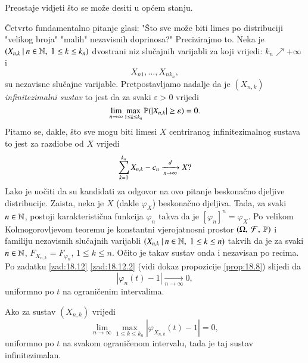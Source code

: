 Preostaje vidjeti \v sto se mo\v ze desiti u op\' cem stanju.

\v Cetvrto fundamentalno pitanje glasi: "\v Sto sve mo\v ze biti limes po distribuciji "velikog broja" "malih" nezavisnih doprinosa?"
Precizirajmo to.
Neka je $({X_{n, k}} \: | \: {n \in \mathbb{N}, \; 1 \leq k \leq k_n})$ dvostrani niz slu\v cajnih varijabli za koji vrijedi: $k_n \nearrow +\infty$ i
\begin{equation*}
    X_{n1}, \ldots, X_{n k_n},
\end{equation*}
su nezavisne slu\v cajne varijable.
Pretpostavljamo nadalje da je $(X_{n, k})$ \emph{infinitezimalni sustav} to jest da za svaki $\varepsilon > 0$ vrijedi
\begin{equation}    \label{jed:20.12}
    \lim\limits_{n \to \infty} \max\limits_{1 \leq k \leq k_n} \mathbb{P} (|X_{n, k}| \geq \varepsilon) = 0.
\end{equation}
Pitamo se, dakle, \v sto sve mogu biti limesi $X$ centriranog infinitezimalnog sustava to jest za razdiobe od $X$ vrijedi
\begin{equation}    \label{jed:20.13}
    \sum\limits_{k = 1}^{k_n} X_{n, k} - c_n \xrightarrow[n \to \infty]{d} X?
\end{equation}
Lako je uo\v citi da su kandidati za odgovor na ovo pitanje beskona\v cno djeljive distribucije.
Zaista, neka je $X$ (dakle $\varphi_X$) beskona\v cno djeljiva.
Tada, za svaki $n \in \mathbb{N}$, postoji karakteristi\v cna funkcija $\varphi_n$ takva da je $[\varphi_n]^n = \varphi_X$.
Po velikom Kolmogorovljevom teoremu je konstantni vjerojatnosni prostor $(\Omega, \: \mathcal{F}, \: \mathbb{P})$ i familiju nezavisnih slu\v cajnih varijabli $({X_{n, k}} \: | \: {n \in \mathbb{N}, \; 1 \leq k \leq n})$ takvih da je za svaki $n \in \mathbb{N}$, $F_{X_{n, k}} = F_{\varphi_n}$, $1 \leq k \leq n$.
O\v cito je takav sustav onda i nezavisan po recima.
Po zadatku \ref{zad:18.12} \ref{zad:18.12.2} (vidi dokaz propozicije \ref{prop:18.8}) slijedi da
\begin{equation*}
    |\varphi_n (t) - 1| \xrightarrow[n \to \infty]{} 0,
\end{equation*}
uniformno po $t$ na ograni\v cenim intervalima.

\begin{zad} \label{zad:20.14}
    Ako za sustav $(X_{n, k})$ vrijedi
    \begin{equation}
        \lim\limits_{n \to \infty} \max\limits_{1 \leq k \leq k_n} |\varphi_{X_{n, k}}(t) - 1| = 0,
    \end{equation}
    uniformno po $t$ na svakom ograni\v cenom intervalu, tada je taj sustav infinitezimalan.
\end{zad}

